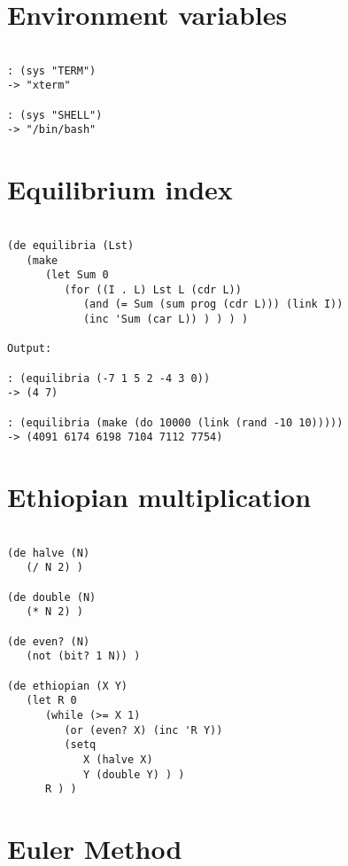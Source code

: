 \section*{Environment variables}

\begin{verbatim}

: (sys "TERM")
-> "xterm"

: (sys "SHELL")
-> "/bin/bash"

\end{verbatim}

\section*{Equilibrium index}

\begin{verbatim}

(de equilibria (Lst)
   (make
      (let Sum 0
         (for ((I . L) Lst L (cdr L))
            (and (= Sum (sum prog (cdr L))) (link I))
            (inc 'Sum (car L)) ) ) ) )

Output:

: (equilibria (-7 1 5 2 -4 3 0))
-> (4 7)

: (equilibria (make (do 10000 (link (rand -10 10)))))
-> (4091 6174 6198 7104 7112 7754)

\end{verbatim}

\section*{Ethiopian multiplication}

\begin{verbatim}

(de halve (N)
   (/ N 2) )

(de double (N)
   (* N 2) )

(de even? (N)
   (not (bit? 1 N)) )

(de ethiopian (X Y)
   (let R 0
      (while (>= X 1)
         (or (even? X) (inc 'R Y))
         (setq
            X (halve X)
            Y (double Y) ) )
      R ) )

\end{verbatim}

\section*{Euler Method}


